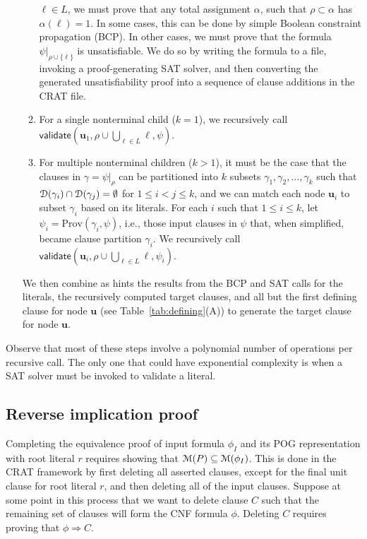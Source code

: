 \documentclass[letterpaper,USenglish,cleveref, autoref, thm-restate]{lipics-v2021}
\newcommand{\obar}[1]{\overline{#1}}
\newcommand{\lit}{\ell}
\newcommand{\dependencyset}{{\cal D}}
\newcommand{\imply}{\Rightarrow}
\newcommand{\passign}{\rho}
\newcommand{\modelset}{{\cal M}}
\newcommand{\validate}{\textsf{validate}}
\newcommand{\prov}{\textrm{Prov}}
\newcommand{\inputformula}{\phi_I}
\newcommand{\makenode}[1]{\mathbf{#1}}
\newcommand{\nodeu}{\makenode{u}}
\newcommand{\simplify}[2]{#1|_{#2}}
\begin{document}
\begin{enumerate}
\begin{enumerate}
  $\lit \in L$, we must prove that any total assignment $\alpha$, such that
  $\passign \subset \alpha$ has $\alpha(\lit) = 1$.  In some
  cases, this can be done by simple Boolean constraint propagation (BCP).
  In other cases, we must prove that the formula
  $\simplify{\psi}{\passign \cup \{\obar{\lit}\}}$ is unsatisfiable.  We
  do so by writing the formula to a file, invoking a proof-generating
  SAT solver, and then converting the generated unsatisfiability proof
  into a sequence of clause additions in the CRAT file.
\item For a single nonterminal child ($k = 1$), we recursively call
  $\validate \left(\nodeu_1, \passign \cup \bigcup_{\lit \in L} \lit, \psi\right)$.
\item For multiple nonterminal children ($k > 1$),
  it must be the case that the clauses in
  $\gamma = \simplify{\psi}{\passign}$ can be partitioned into $k$ subsets
  $\gamma_1, \gamma_2, \ldots, \gamma_k$ such that $\dependencyset(\gamma_i)
  \cap \dependencyset(\gamma_j) = \emptyset$ for $1 \leq i < j \leq k$,
  and we can match each node $\nodeu_i$ to subset $\gamma_i$ based on its
  literals.
  For each $i$ such that $1 \leq i \leq k$, let $\psi_i = \prov(\gamma_i, \psi)$, i.e., those input clauses in $\psi$ that, when simplified, became clause partition $\gamma_i$.
  We recursively call
  $\validate \left(\nodeu_i, \passign \cup \bigcup_{\lit \in L} \lit, \psi_i\right)$.
\end{enumerate}
  We then combine as hints the results from the BCP and SAT calls for
  the literals, the recursively computed target clauses, and all but
  the first defining clause for node $\nodeu$
(see Table~\ref{tab:defining}(A))
to generate the target clause for node $\nodeu$.
\end{enumerate}
Observe that most of these steps involve a polynomial number of
operations per recursive call.  The only one that could have
exponential complexity is when a SAT solver must be invoked to validate a
literal.

\subsection{Reverse implication proof}

Completing the equivalence proof of input formula $\inputformula$ and its POG
representation with root literal $r$ requires showing that
$\modelset(P) \subseteq \modelset(\inputformula)$.  This is done in the
CRAT framework by first deleting all asserted clauses, except for the
final unit clause for root literal $r$, and then deleting all of the
input clauses.  Suppose at some point in this process that we want to
delete clause $C$ such that the remaining set of clauses will form the
CNF formula $\phi$.  Deleting $C$ requires proving that
$\phi \imply C$.
\end{document}
